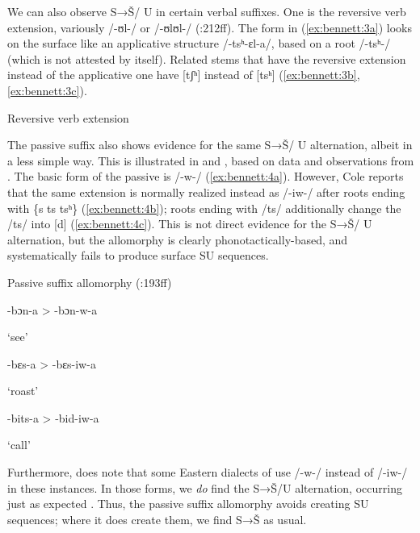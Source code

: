 We can also observe S→Š/ {\longrule} U in certain verbal suffixes. One is the reversive verb extension, variously /-ʊl-/ or /-ʊlʊl-/  (\citealt{Cole1955}:212ff). The form in (\ref{ex:bennett:3a}) looks on the surface like an applicative structure /-tsʰ-ɛl-a/, based on a root /-tsʰ-/ (which is not attested by itself). Related stems that have the reversive extension instead of the applicative one have [tʃʰ] instead of [tsʰ] (\ref{ex:bennett:3b},\ref{ex:bennett:3c}).

\ea\label{ex:bennett:3}
Reversive verb extension
\ea\label{ex:bennett:3a}

\ex\label{ex:bennett:3b}

\ex\label{ex:bennett:3c}

\z
\z

The passive suffix also shows evidence for the same S→Š/ {\longrule} U alternation, albeit in a less simple way. This is illustrated in  and , based on data and observations from \citet[193--195]{Cole1955}. The basic form of the passive is /-w-/ (\ref{ex:bennett:4a}). However, Cole reports that the same extension is normally realized instead as /-iw-/ after roots ending with \{s ts tsʰ\} (\ref{ex:bennett:4b}); roots ending with /ts/ additionally change the /ts/ into [d] (\ref{ex:bennett:4c}). This is not direct evidence for the S→Š/ {\longrule} U alternation, but the allomorphy is clearly phonotactically-based, and systematically fails to produce surface SU sequences.

\ea\label{ex:bennett:4}
Passive suffix allomorphy (\citealt{Cole1955}:193ff)
\ea\label{ex:bennett:4a}

-bɔn-a  >  -bɔn-w-a

     ‘see’
\ex\label{ex:bennett:4b}

-bɛs-a  >  -bɛs-iw-a

     ‘roast’
\ex\label{ex:bennett:4c}

-bits-a  >  -bid-iw-a

     ‘call’\\
\z
\z

Furthermore, \citet{Cole1955} does note that some Eastern dialects of  use /-w-/ instead of /-iw-/ in these instances. In those forms, we \textit{do} find the S→Š/{\longrule}U alternation, occurring just as expected . Thus, the passive suffix allomorphy avoids creating SU sequences; where it does create them, we find S→Š as usual.

